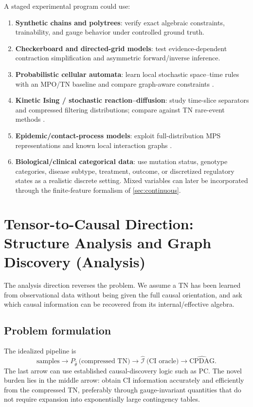 \documentclass[11pt]{article}
\theoremstyle{remark}
\newcommand{\CPDAG}{\mathrm{CPDAG}}
\newcommand{\cI}{\mathcal I}
\begin{document}
A staged experimental program could use:
\begin{enumerate}
\item \textbf{Synthetic chains and polytrees}: verify exact algebraic constraints, trainability, and gauge behavior under controlled ground truth.
\item \textbf{Checkerboard and directed-grid models}: test evidence-dependent contraction simplification and asymmetric forward/inverse inference.
\item \textbf{Probabilistic cellular automata}: learn local stochastic space--time rules with an MPO/TN baseline and compare graph-aware constraints \cite{casagrande2024pca}.
\item \textbf{Kinetic Ising / stochastic reaction--diffusion}: study time-slice separators and compressed filtering distributions; compare against TN rare-event methods \cite{nicholson2023rare}.
\item \textbf{Epidemic/contact-process models}: exploit full-distribution MPS representations and known local interaction graphs \cite{merbis2023epidemic}.
\item \textbf{Biological/clinical categorical data}: use mutation status, genotype categories, disease subtype, treatment, outcome, or discretized regulatory states as a realistic discrete setting. Mixed variables can later be incorporated through the finite-feature formalism of \cref{sec:continuous}.
\end{enumerate}

\section{Tensor-to-Causal Direction: Structure Analysis and Graph Discovery (Analysis)}
\label{sec:analysis}

The analysis direction reverses the problem. We assume a TN has been learned from observational data without being given the full causal orientation, and ask which causal information can be recovered from its internal/effective algebra.

\subsection{Problem formulation}

The idealized pipeline is
\begin{equation}
\text{samples}
\longrightarrow P_{\hat\theta}\ \text{(compressed TN)}
\longrightarrow \widehat{\cI}\ \text{(CI oracle)}
\longrightarrow \widehat{\CPDAG}.
\label{eq:analysis-pipeline}
\end{equation}
The last arrow can use established causal-discovery logic such as PC. The novel burden lies in the middle arrow: obtain CI information accurately and efficiently from the compressed TN, preferably through gauge-invariant quantities that do not require expansion into exponentially large contingency tables.
\end{document}
